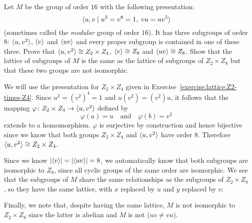  Let $M$ be the group of order $16$ with the following
presentation:
\begin{equation*}
  \langle{u,v \mid u^2 = v^8 = 1, \; vu = uv^5}\rangle
\end{equation*}
(sometimes called the {\em modular} group of order $16$). It has three
subgroups of order $8$: $\langle{u,v^2}\rangle$, $\langle{v}\rangle$ and $\langle{uv}\rangle$ and
every proper subgroup is contained in one of these three. Prove that
$\langle{u,v^2}\rangle\cong Z_2\times Z_4$, $\langle{v}\rangle\cong Z_8$ and
$\langle{uv}\rangle\cong Z_8$. Show that the lattice of subgroups of $M$ is the
same as the lattice of subgroups of $Z_2\times Z_8$ but that these two
groups are not isomorphic.
\label{exercise:lattice:modular16}
\begin{solution}
  We will use the presentation for $Z_2\times Z_4$ given in
  Exercise~\ref{exercise:lattice:Z2-times-Z4}. Since
  $u^2 = (v^2)^4 = 1$ and $u(v^2) = (v^2)u$, it follows that the
  mapping $\varphi\colon Z_2\times Z_4\to\langle{u,v^2}\rangle$ defined by
  \begin{equation*}
    \varphi(a) = u
    \quad\text{and}\quad
    \varphi(b) = v^2
  \end{equation*}
  extends to a homomorphism. $\varphi$ is surjective by construction
  and hence bijective since we know that both groups $Z_2\times Z_4$
  and $\langle{u,v^2}\rangle$ have order $8$. Therefore
  $\langle{u,v^2}\rangle\cong Z_2\times Z_4$.

  Since we know $\lvert{\langle{v}\rangle}\rvert = \lvert{\langle{uv}\rangle}\rvert = 8$, we automatically
  know that both subgroups are isomorphic to $Z_8$, since all cyclic
  groups of the same order are isomorphic. We see that the subgroups
  of $M$ share the same relationships as the subgroups of
  $Z_2\times Z_8$, so they have the same lattice, with $x$ replaced by
  $u$ and $y$ replaced by $v$:
  \begin{center}
  \end{center}

  Finally, we note that, despite having the same lattice, $M$ is not
  isomorphic to $Z_2\times Z_8$ since the latter is abelian and $M$ is
  not ($uv \neq vu$).
\end{solution}

